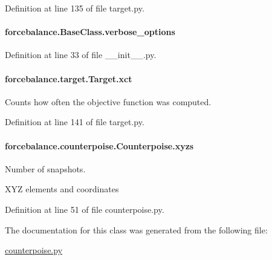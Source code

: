 Definition at line 135 of file target.\-py.

\hypertarget{classforcebalance_1_1BaseClass_afd68efa29ccd2f320f4cf82198214aac}{
\paragraph[{verbose\-\_\-options}]{\setlength{\rightskip}{0pt plus 5cm}forcebalance.\-Base\-Class.\-verbose\-\_\-options\hspace{0.3cm}{\ttfamily [inherited]}}}\label{classforcebalance_1_1BaseClass_afd68efa29ccd2f320f4cf82198214aac}


Definition at line 33 of file \-\_\-\-\_\-init\-\_\-\-\_\-.\-py.

\hypertarget{classforcebalance_1_1target_1_1Target_aad2e385cfbf7b4a68f1c2cb41133fe82}{
\paragraph[{xct}]{\setlength{\rightskip}{0pt plus 5cm}forcebalance.\-target.\-Target.\-xct\hspace{0.3cm}{\ttfamily [inherited]}}}\label{classforcebalance_1_1target_1_1Target_aad2e385cfbf7b4a68f1c2cb41133fe82}


Counts how often the objective function was computed. 



Definition at line 141 of file target.\-py.

\hypertarget{classforcebalance_1_1counterpoise_1_1Counterpoise_a2793b896bff71a3c6b9c6f6568ba1be2}{
\paragraph[{xyzs}]{\setlength{\rightskip}{0pt plus 5cm}forcebalance.\-counterpoise.\-Counterpoise.\-xyzs}}\label{classforcebalance_1_1counterpoise_1_1Counterpoise_a2793b896bff71a3c6b9c6f6568ba1be2}


Number of snapshots. 

X\-Y\-Z elements and coordinates 

Definition at line 51 of file counterpoise.\-py.



The documentation for this class was generated from the following file\-:\begin{DoxyCompactItemize}
\item 
\hyperlink{counterpoise_8py}{counterpoise.\-py}\end{DoxyCompactItemize}
